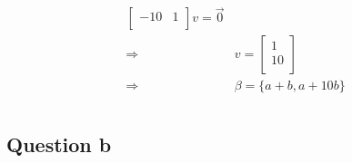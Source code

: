 \documentclass{article}
\begin{document}
\begin{equation*}
\begin{split}
\begin{split}
\begin{bmatrix}
                -10&1\\
            \end{bmatrix}v=\overrightarrow{0}\\
            \Rightarrow&v=\begin{bmatrix}
                1\\
                10\\
            \end{bmatrix}\\
            \Rightarrow&\beta=\{a+b,a+10b\}\\
        \end{split}
    \end{split}
\end{equation*}

\subsection{Question b}
\end{document}
